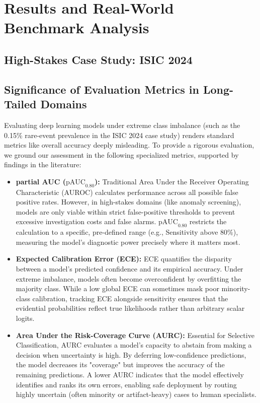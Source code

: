 \documentclass[letterpaper]{article} %
\begin{document}
\section{Results and Real-World Benchmark Analysis}\label{sec:results}

\subsection{High-Stakes Case Study: ISIC 2024}\label{subsec:isic_case_study}

\subsection{Significance of Evaluation Metrics in Long-Tailed Domains}
Evaluating deep learning models under extreme class imbalance (such as the 0.15\% rare-event prevalence in the ISIC 2024 case study) renders standard metrics like overall accuracy deeply misleading. To provide a rigorous evaluation, we ground our assessment in the following specialized metrics, supported by findings in the literature:

\begin{itemize}
    \item \textbf{partial AUC ($\text{pAUC}_{0.80}$):} Traditional Area Under the Receiver Operating Characteristic (AUROC) calculates performance across all possible false positive rates. However, in high-stakes domains (like anomaly screening), models are only viable within strict false-positive thresholds to prevent excessive investigation costs and false alarms. $\text{pAUC}_{0.80}$ restricts the calculation to a specific, pre-defined range (e.g., Sensitivity above 80\%), measuring the model's diagnostic power precisely where it matters most.
    \item \textbf{Expected Calibration Error (ECE):} ECE quantifies the disparity between a model's predicted confidence and its empirical accuracy. Under extreme imbalance, models often become overconfident by overfitting the majority class. While a low global ECE can sometimes mask poor minority-class calibration, tracking ECE alongside sensitivity ensures that the evidential probabilities reflect true likelihoods rather than arbitrary scalar logits.
    \item \textbf{Area Under the Risk-Coverage Curve (AURC):} Essential for Selective Classification, AURC evaluates a model's capacity to abstain from making a decision when uncertainty is high. By deferring low-confidence predictions, the model decreases its "coverage" but improves the accuracy of the remaining predictions. A lower AURC indicates that the model effectively identifies and ranks its own errors, enabling safe deployment by routing highly uncertain (often minority or artifact-heavy) cases to human specialists.
\end{itemize}
\end{document}
